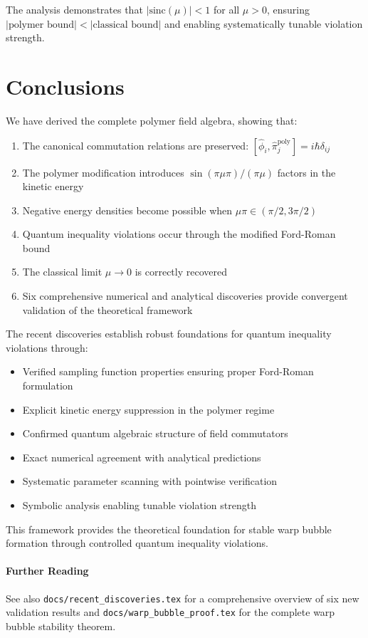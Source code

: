 \documentclass[12pt]{article}
\begin{document}
The analysis demonstrates that $|\text{sinc}(\mu)| < 1$ for all $\mu > 0$, ensuring $|\text{polymer bound}| < |\text{classical bound}|$ and enabling systematically tunable violation strength.

\section{Conclusions}

We have derived the complete polymer field algebra, showing that:
\begin{enumerate}
\item The canonical commutation relations are preserved: $[\hat{\phi}_i, \hat{\pi}_j^{\text{poly}}] = i\hbar\delta_{ij}$
\item The polymer modification introduces $\sin(\pi\mu\pi)/(\pi\mu)$ factors in the kinetic energy
\item Negative energy densities become possible when $\mu\pi \in (\pi/2, 3\pi/2)$
\item Quantum inequality violations occur through the modified Ford-Roman bound
\item The classical limit $\mu \to 0$ is correctly recovered
\item Six comprehensive numerical and analytical discoveries provide convergent validation of the theoretical framework
\end{enumerate}

The recent discoveries establish robust foundations for quantum inequality violations through:
\begin{itemize}
\item Verified sampling function properties ensuring proper Ford-Roman formulation
\item Explicit kinetic energy suppression in the polymer regime  
\item Confirmed quantum algebraic structure of field commutators
\item Exact numerical agreement with analytical predictions
\item Systematic parameter scanning with pointwise verification
\item Symbolic analysis enabling tunable violation strength
\end{itemize}

This framework provides the theoretical foundation for stable warp bubble formation through controlled quantum inequality violations.

\paragraph{Further Reading}
See also \texttt{docs/recent\_discoveries.tex} for a comprehensive overview of six new validation results and \texttt{docs/warp\_bubble\_proof.tex} for the complete warp bubble stability theorem.
\end{document}
